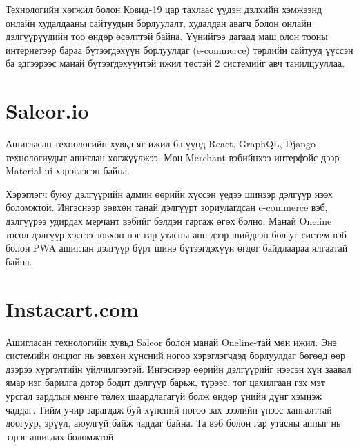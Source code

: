 Технологийн хөгжил болон Ковид-19 цар тахлаас үүдэн дэлхийн хэмжээнд онлайн худалдааны сайтуудын борлуулалт, худалдан авагч болон онлайн дэлгүүрүүдийн тоо өндөр өсөлттэй байна. Үүнийгээ дагаад маш олон тооны интернетээр бараа бүтээгдэхүүн борлуулдаг (e-commerce) төрлийн сайтууд үүссэн ба эдгээрээс манай бүтээгдэхүүнтэй ижил төстэй 2 системийг авч танилцууллаа.

    
    
\section{Saleor.io}
Ашигласан технологийн хувьд яг ижил ба үүнд React, GraphQL, Django технологиудыг ашиглан хөгжүүлжээ. Мөн Merchant вэбийнхээ интерфэйс дээр Material-ui хэрэглэсэн байна. 

Хэрэглэгч буюу дэлгүүрийн админ өөрийн хүссэн үедээ шинээр дэлгүүр нээх боломжтой. Ингэснээр зөвхөн танай дэлгүүрт зориулагдсан e-commerce вэб, дэлгүүрээ удирдах мерчант вэбийг бэлдэн гаргаж өгөх болно. Манай Oneline төсөл дэлгүүр хэсгээ зөвхөн нэг гар утасны апп дээр шийдсэн бол уг систем вэб болон PWA ашиглан дэлгүүр бүрт шинэ бүтээгдэхүүн өгдөг байдлаараа ялгаатай байна. 


\section{Instacart.com}
Ашигласан технологийн хувьд Saleor болон манай Oneline-тай мөн ижил. Энэ системийн онцлог нь зөвхөн хүнсний ногоо хэрэглэгчдэд борлуулдаг бөгөөд өөр дээрээ хүргэлтийн үйлчилгээтэй. Ингэснээр өөрийн дэлгүүрийг нээсэн хүн заавал ямар нэг барилга дотор бодит дэлгүүр барьж, түрээс, тог цахилгаан гэх мэт урсгал зардлын мөнгө төлөх шаардлагагүй болж өндөр үнийн дүнг хэмнэж чаддаг. Тийм учир зарагдаж буй хүнсний ногоо зах зээлийн үнээс хангалттай доогуур, эрүүл, аюулгүй байж чаддаг байна. Та вэб болон гар утасны аппыг нь зэрэг ашиглах боломжтой